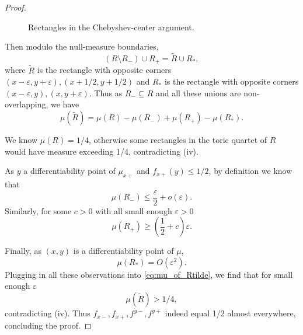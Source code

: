 \documentclass{article}
\theoremstyle{definition}
\begin{document}
\begin{proof}
\begin{figure}[h]
\caption{Rectangles in the Chebyshev-center argument.}
\label{fig:chebyshev_center}
\end{figure}
    
    Then modulo the null-measure boundaries,
    $$(R\setminus R_{-})\cup R_{+}=\widetilde{R}\cup R_\ast,$$
    where $\widetilde{R}$ is the rectangle with opposite corners $(x-\varepsilon, y+\varepsilon), (x+1/2, y+1/2)$ and $R_\ast$ is the rectangle with opposite corners $(x-\varepsilon, y), (x, y+\varepsilon)$. Thus as $R_{-}\subseteq R$ and all these unions are non-overlapping, we have
    \begin{equation} \label{eq:mu_of_Rtilde}
        \mu(\widetilde{R})=\mu(R)-\mu(R_{-})+\mu(R_{+})-\mu(R_\ast). 
    \end{equation}

    We know $\mu(R)=1/4$, otherwise some rectangles in the toric quartet of $R$ would have measure exceeding 1/4, contradicting (iv).
    
    As $y$ a differentiability point of $\mu_{x+}$ and $f_{x+}(y)\leq 1/2$, by definition we know that 
    $$\mu(R_{-})\leq \frac{\varepsilon}{2}+o(\varepsilon).$$
    Similarly, for some $c>0$ with all small enough $\varepsilon>0$
    $$\mu(R_{+})\geq \left(\frac{1}{2}+c\right)\varepsilon.$$
    
    Finally, as $(x, y)$ is a differentiability point of $\mu$,
    $$\mu(R_\ast)=O(\varepsilon^2).$$
    Plugging in all these observations into \eqref{eq:mu_of_Rtilde}, we find that for small enough $\varepsilon$
    $$\mu(\widetilde{R})>1/4,$$
    contradicting (iv). Thus $f_{x-}, f_{x+}, f^{y-}, f^{y+}$ indeed equal 1/2 almost everywhere, concluding the proof.
    
\end{proof}
\end{document}

